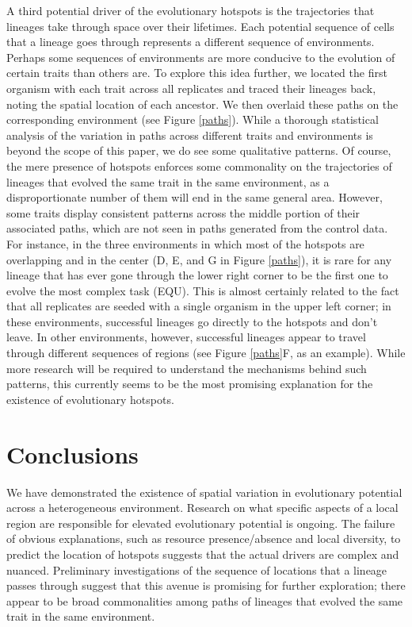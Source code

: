 \documentclass[letterpaper]{article}
\begin{document}
A third potential driver of the evolutionary hotspots is the trajectories that lineages take through space over their lifetimes. Each potential sequence of cells that a lineage goes through represents a different sequence of environments. Perhaps some sequences of environments are more conducive to the evolution of certain traits than others are. To explore this idea further, we located the first organism with each trait across all replicates and traced their lineages back, noting the spatial location of each ancestor. We then overlaid these paths on the corresponding environment (see Figure \ref{paths}). While a thorough statistical analysis of the variation in paths across different traits and environments is beyond the scope of this paper, we do see some qualitative patterns. Of course, the mere presence of hotspots enforces some commonality on the trajectories of lineages that evolved the same trait in the same environment, as a disproportionate number of them will end in the same general area. However, some traits display consistent patterns across the middle portion of their associated paths, which are not seen in paths generated from the control data. For instance, in the three environments in which most of the hotspots are overlapping and in the center (D, E, and G in Figure \ref{paths}), it is rare for any lineage that has ever gone through the lower right corner to be the first one to evolve the most complex task (EQU). This is almost certainly related to the fact that all replicates are seeded with a single organism in the upper left corner; in these environments, successful lineages go directly to the hotspots and don't leave. In other environments, however, successful lineages appear to travel through different sequences of regions (see Figure \ref{paths}F, as an example). While more research will be required to understand the mechanisms behind such patterns, this currently seems to be the most promising explanation for the existence of evolutionary hotspots.


\section{Conclusions}
    We have demonstrated the existence of spatial variation in evolutionary potential across a heterogeneous environment. Research on what specific aspects of a local region are responsible for elevated evolutionary potential is ongoing. The failure of obvious explanations, such as resource presence/absence and local diversity, to predict the location of hotspots suggests that the actual drivers are complex and nuanced. Preliminary investigations of the sequence of locations that a lineage passes through suggest that this avenue is promising for further exploration; there appear to be broad commonalities among paths of lineages that evolved the same trait in the same environment.
 
\end{document}
